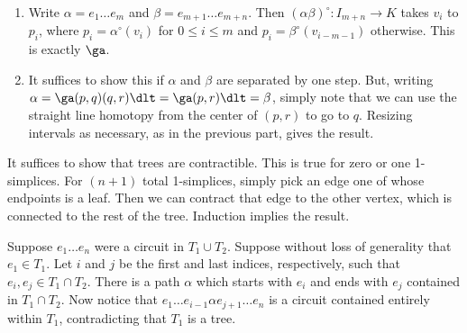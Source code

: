 \documentclass[../../solutions.tex]{subfiles}
\begin{document}
\begin{exercise} \leavevmode
\begin{enumerate}
\item
Write $\alpha=e_1\dots e_m$ and $\beta=e_{m+1}\dots e_{m+n}$.
Then $(\alpha\beta)^\circ:I_{m+n}\to K$ takes $v_i$ to $p_i$, where $p_i=\alpha^\circ(v_i)$ for $0\le i\le m$ and $p_i=\beta^\circ(v_{i-m-1})$ otherwise.
This is exactly $\ga$.

\item
It suffices to show this if $\alpha$ and $\beta$ are separated by one step.
But, writing $\alpha=\ga(p,q)(q,r)\dlt=\ga(p,r)\dlt=\beta$, simply note that we can use the straight line homotopy from the center of $(p,r)$ to go to $q$.
Resizing intervals as necessary, as in the previous part, gives the result.
\end{enumerate}
\end{exercise}

\begin{exercise} \leavevmode
It suffices to show that trees are contractible.
This is true for zero or one 1-simplices.
For $(n+1)$ total 1-simplices, simply pick an edge one of whose endpoints is a leaf.
Then we can contract that edge to the other vertex, which is connected to the rest of the tree.
Induction implies the result.
\end{exercise}

\begin{exercise} \leavevmode
Suppose $e_1\dots e_n$ were a circuit in $T_1\cup T_2$.
Suppose without loss of generality that $e_1\in T_1$.
Let $i$ and $j$ be the first and last indices, respectively, such that $e_i,e_j\in T_1\cap T_2$.
There is a path $\alpha$ which starts with $e_i$ and ends with $e_j$ contained in $T_1\cap T_2$.
Now notice that $e_1\dots e_{i-1}\alpha e_{j+1}\dots e_n$ is a circuit contained entirely within $T_1$, contradicting that $T_1$ is a tree.
\end{exercise}
\end{document}
